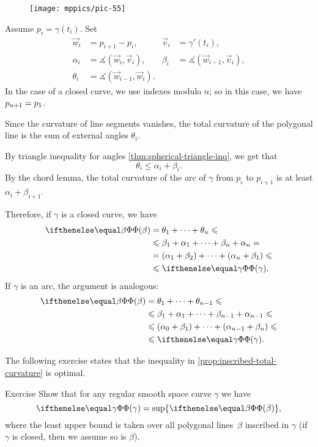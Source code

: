 \begin{wrapfigure}[7]{o}{40 mm}
\vskip-4mm
\centering
\texttt{[image: mppics/pic-55]}
\vskip0mm
\end{wrapfigure}

Assume $p_i=\gamma(t_i)$.
Set 
\begin{align*}
\vec w_i&=p_{i+1}-p_i,& \vec v_i&=\gamma'(t_i),
\\
\alpha_i&=\measuredangle(\vec w_i,\vec v_i),&\beta_i&=\measuredangle(\vec w_{i-1},\vec v_i),
\\
\theta_i&=\measuredangle(\vec w_{i-1},\vec w_i).
\end{align*}
In the case of a closed curve, we use indexes modulo $n$;
so in this case, we have $p_{n+1}\z=p_1$.

Since the curvature of line segments vanishes, 
the total curvature of the polygonal line is the sum of external angles $\theta_i$.

By triangle inequality for angles \ref{thm:spherical-triangle-inq}, we get that
\[\theta_i\le \alpha_i+\beta_i.\]
By the chord lemma, the total curvature of the arc of $\gamma$ from $p_i$ to $p_{i+1}$ is at least $\alpha_i+\beta_{i+1}$. 

Therefore, if $\gamma$ is a closed curve, we have
\begin{align*}
\tc{\beta}&=\theta_1+\dots+\theta_n\le 
\\
&\le\beta_1+\alpha_1+\dots+\beta_n+\alpha_n = 
\\
&=(\alpha_1+\beta_2)+\dots+(\alpha_n+\beta_1) \le 
\\
&\le \tc\gamma.
\end{align*}
If $\gamma$ is an arc, the argument is analogous:
\begin{align*}
\tc{\beta}&=\theta_1+\dots+\theta_{n-1}\le 
\\
&\le\beta_1+\alpha_1+\dots+\beta_{n-1}+\alpha_{n-1} \le
\\
&\le (\alpha_0+\beta_1)+\dots+(\alpha_{n-1}+\beta_n) \le 
\\
&\le \tc\gamma.
\end{align*}
\qedsf

The following exercise states that the inequality in \ref{prop:inscribed-total-curvature} is optimal.

\begin{thm}{Exercise}\label{ex:total-curvature=}
Show that for any regular smooth space curve $\gamma$ we have 
\[\tc\gamma=\sup\{\tc\beta\},\]
where the least upper bound is taken over all polygonal lines~$\beta$ inscribed in $\gamma$
(if $\gamma$ is closed, then we assume so is $\beta$).
\end{thm}

